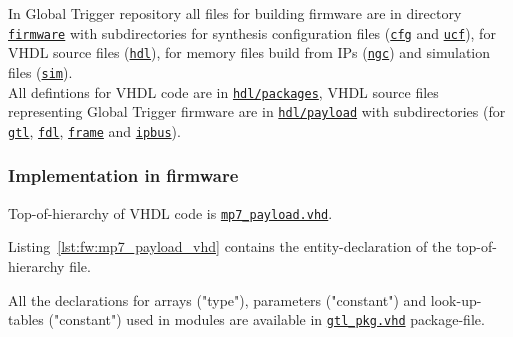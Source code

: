 In Global Trigger repository all files for building firmware are in directory \href{\gitbranch/firmware}{\texttt{\textquotesingle firmware\textquotesingle}} with subdirectories for synthesis configuration files (\href{\gitbranch/firmware/cfg}{\texttt{\textquotesingle cfg\textquotesingle }} and \href{\gitbranch/firmware/ucf}{\texttt{\textquotesingle ucf\textquotesingle }}), for VHDL source files (\href{\gitbranch/firmware/hdl}{\texttt{\textquotesingle hdl\textquotesingle }}), for memory files build from IPs (\href{\gitbranch/firmware/ngc}{\texttt{\textquotesingle ngc\textquotesingle }}) and simulation files (\href{\gitbranch/firmware/sim}{\texttt{\textquotesingle sim\textquotesingle }}).\\
All defintions for VHDL code are in \href{\gitbranch/firmware/hdl/packages}{\texttt{\textquotesingle hdl/packages\textquotesingle }}, VHDL source files representing Global Trigger firmware are in \href{\gitbranch/firmware/hdl/payload}{\texttt{\textquotesingle hdl/payload\textquotesingle }} with subdirectories (for \href{\gitbranch/firmware/hdl/payload/gtl}{\texttt{\textquotesingle gtl\textquotesingle }}, \href{\gitbranch/firmware/hdl/payload/fdl}{\texttt{\textquotesingle fdl\textquotesingle }},  \href{\gitbranch/firmware/hdl/payload/frame}{\texttt{\textquotesingle frame\textquotesingle }} and \href{\gitbranch/firmware/hdl/payload/ipbus}{\texttt{\textquotesingle ipbus\textquotesingle }}).

\subsubsection{Implementation in firmware}
\label{sec:fw:implementation_firmware}

Top-of-hierarchy of VHDL code is \href{\gitbranch/firmware/hdl/payload/mp7\_payload.vhd}{\texttt{\textquotesingle mp7\_payload.vhd\textquotesingle }}.

Listing~\ref{lst:fw:mp7_payload_vhd} contains the entity-declaration of the top-of-hierarchy file.



All the declarations for arrays ("type"), parameters ("constant") and look-up-tables ("constant") used in modules are available in \href{\gitbranch/firmware/hdl/packages/gtl\_pkg.vhd}{\texttt{\textquotesingle gtl\_pkg.vhd\textquotesingle }} package-file.

